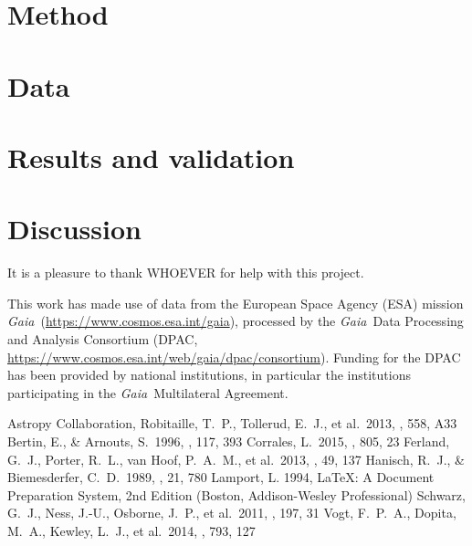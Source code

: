 \documentclass[modern]{aastex62}
\newcommand{\acronym}[1]{{\small{#1}}}
\newcommand{\project}[1]{\textsl{#1}}
\newcommand{\gaia}{\project{Gaia}}
\begin{document}
\section{Method}

\section{Data}

\section{Results and validation}

\section{Discussion}

\acknowledgements
It is a pleasure to thank
  WHOEVER
for help with this project.

This work has made use of data from the European Space Agency (ESA) mission
\gaia\ (\url{https://www.cosmos.esa.int/gaia}), processed by the \gaia\ Data
Processing and Analysis Consortium (\acronym{DPAC},
\url{https://www.cosmos.esa.int/web/gaia/dpac/consortium}). Funding for the
\acronym{DPAC}
has been provided by national institutions, in particular the institutions
participating in the \gaia\ Multilateral Agreement.

\begin{thebibliography}{}
 Astropy Collaboration, Robitaille, T.~P., Tollerud, E.~J., et al.\ 2013, \aap, 558, A33 
 Bertin, E., \& Arnouts, S.\ 1996, \aaps, 117, 393 
 Corrales, L.\ 2015, \apj, 805, 23
 Ferland, G.~J., Porter, R.~L., van Hoof, P.~A.~M., et al.\ 2013, \rmxaa, 49, 137
 Hanisch, R.~J., \& Biemesderfer, C.~D.\ 1989, \baas, 21, 780 
 Lamport, L. 1994, LaTeX: A Document Preparation System, 2nd Edition (Boston, Addison-Wesley Professional)
 Schwarz, G.~J., Ness, J.-U., Osborne, J.~P., et al.\ 2011, \apjs, 197, 31  
 Vogt, F.~P.~A., Dopita, M.~A., Kewley, L.~J., et al.\ 2014, \apj, 793, 127  
\end{thebibliography}
\end{document}
